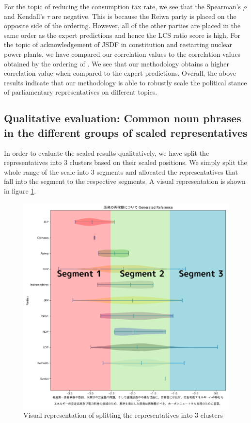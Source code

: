 \documentclass[final,5p,times,twocolumn,authoryear]{elsarticle}
\begin{document}
For the topic of reducing the consumption tax rate, we see that the Spearman's $\rho$ and Kendall's $\tau$ are negative. This is because the Reiwa party is placed on the opposite side of the ordering. However, all of the other parties are placed in the same order as the expert predictions and hence the LCS ratio score is high. For the topic of acknowledgement of JSDF in constitution and restarting nuclear power plants, we have compared our correlation values to the correlation values obtained by the ordering of \citeauthor{kato2024lupinllmbasedpoliticalideology}. We see that our methodology obtains a higher correlation value when compared to the expert predictions. Overall, the above results indicate that our methodology is able to robustly scale the political stance of parliamentary representatives on different topics.

\FloatBarrier
\subsection{Qualitative evaluation: Common noun phrases in the different groups of scaled representatives}
\label{section: qual-eval}
In order to evaluate the scaled results qualitatively, we have split the representatives into 3 clusters based on their scaled positions. We simply split the whole range of the scale into 3 segments and allocated the representatives that fall into the segment to the respective segments. A visual representation is shown in figure \ref{fig:3clusters}.

\begin{figure}
\centering
  \centering
  \includegraphics[width=0.8\linewidth]{figs/Segment 1.png}
  \caption{Visual representation of splitting the representatives into 3 clusters}
  \label{fig:3clusters}
\end{figure}
\end{document}
